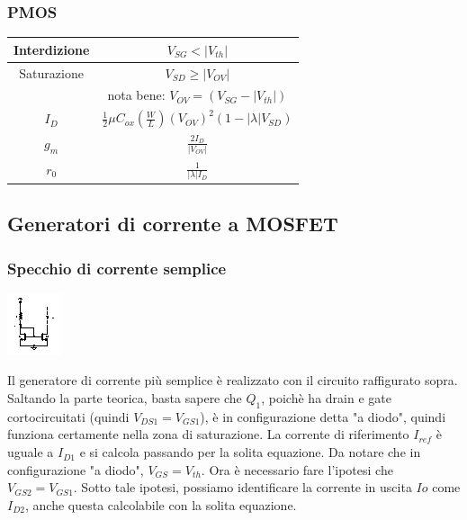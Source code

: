 \documentclass[a4paper,twocolumn,notitlepage]{book}
\begin{document}
	\subsubsection*{PMOS}
		\begingroup
		\setlength{\tabcolsep}{4pt}
		\renewcommand{\arraystretch}{2.3}
		\begin{tabular}{|c|c|}
		\hline
		Interdizione & $V_{SG} < |V_{th}|$ \\
		\hline
		Saturazione & $V_{SD} \geq |V_{OV}|$\\
		& nota bene: $V_{OV}=(V_{SG}-|V_{th}|)$\\
		\hline
		$I_D$ & $ \displaystyle \frac{1}{2} \mu C_{ox} \left( \frac{W}{L} \right) (V_{OV})^2 (1- | \lambda | V_{SD}) $\\
		\hline
		$g_m$ & $ \displaystyle \frac{2 I_D}{|V_{OV}|}$ \\
		\hline
		$r_0$ & $\displaystyle \frac{1}{| \lambda | I_D}$ \\
		\hline
		\end{tabular}
		\endgroup
		
	\subsection*{Generatori di corrente a MOSFET}
	\subsubsection*{Specchio di corrente semplice}
	\begin{center}
	\includegraphics[scale=8]{schemi/specchio_semplice.eps}
	\end{center}
	Il generatore di corrente più semplice è realizzato con il circuito raffigurato sopra. Saltando la parte teorica, basta sapere che $Q_1$, poichè ha drain e gate cortocircuitati (quindi $V_{DS1}=V_{GS1}$), è in configurazione detta "a diodo", quindi funziona certamente nella zona di saturazione. La corrente di riferimento $I_{ref}$ è uguale a $I_{D1}$ e si calcola passando per la solita equazione. Da notare che in configurazione "a diodo", $V_{GS}=V_{th}$.\newline
	Ora è necessario fare l'ipotesi che $V_{GS2}=V_{GS1}$. Sotto tale ipotesi, possiamo identificare la corrente in uscita $Io$ come $I_{D2}$, anche questa calcolabile con la solita equazione.
	
\end{document}
